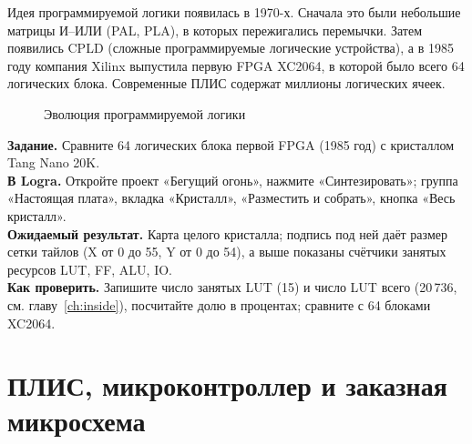 Идея программируемой логики появилась в 1970-х. Сначала это были
небольшие матрицы И--ИЛИ (PAL, PLA), в которых пережигались перемычки.
Затем появились CPLD (сложные программируемые логические устройства), а в 1985 году компания Xilinx
выпустила первую FPGA XC2064, в которой было всего 64 логических блока.
Современные ПЛИС содержат миллионы логических ячеек.

\begin{figure}[H]
\centering
{}
\caption{Эволюция программируемой логики}
\end{figure}

\begin{diybox}
\textbf{Задание.} Сравните 64 логических блока первой FPGA (1985 год) с кристаллом Tang Nano 20K.\\
\textbf{В Logra.} Откройте проект «Бегущий огонь», нажмите «Синтезировать»; группа «Настоящая плата», вкладка «Кристалл», «Разместить и собрать», кнопка «Весь кристалл».\\
\textbf{Ожидаемый результат.} Карта целого кристалла; подпись под ней даёт размер сетки тайлов (X от 0 до 55, Y от 0 до 54), а выше показаны счётчики занятых ресурсов LUT, FF, ALU, IO.\\
\textbf{Как проверить.} Запишите число занятых LUT (15) и число LUT всего (20\,736, см. главу~\ref{ch:inside}), посчитайте долю в процентах; сравните с 64 блоками XC2064.
\end{diybox}

\section{ПЛИС, микроконтроллер и заказная микросхема}


